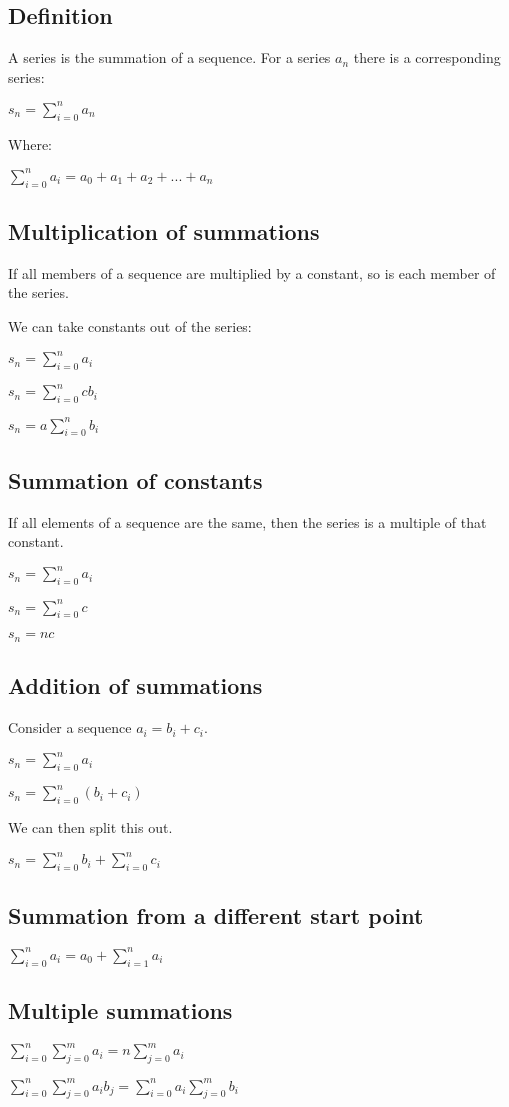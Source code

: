 
\subsection{Definition}

A series is the summation of a sequence. For a series \(a_n\) there is a corresponding series:

\(s_n=\sum_{i=0}^na_n\)

Where:

\(\sum_{i=0}^na_i=a_0+a_1+a_2+...+a_n\)

\subsection{Multiplication of summations}

If all members of a sequence are multiplied by a constant, so is each member of the series.

We can take constants out of the series:

\(s_n=\sum_{i=0}^na_i\)

\(s_n=\sum_{i=0}^ncb_i\)

\(s_n=a\sum_{i=0}^nb_i\)

\subsection{Summation of constants}

If all elements of a sequence are the same, then the series is a multiple of that constant.

\(s_n=\sum_{i=0}^na_i\)

\(s_n=\sum_{i=0}^nc\)

\(s_n=nc\)

\subsection{Addition of summations}

Consider a sequence \(a_i=b_i+c_i\).

\(s_n=\sum_{i=0}^na_i\)

\(s_n=\sum_{i=0}^n(b_i+c_i)\)

We can then split this out.

\(s_n=\sum_{i=0}^nb_i+\sum_{i=0}^nc_i\)

\subsection{Summation from a different start point}

\(\sum_{i=0}^na_i=a_0+\sum_{i=1}^na_i\)

\subsection{Multiple summations}

\(\sum^n_{i=0} \sum^m_{j=0} a_i=n\sum^m_{j=0} a_i\)

\(\sum^n_{i=0} \sum^m_{j=0} a_i b_j=\sum^n_{i=0}a_i\sum^m_{j=0}b_i\)

